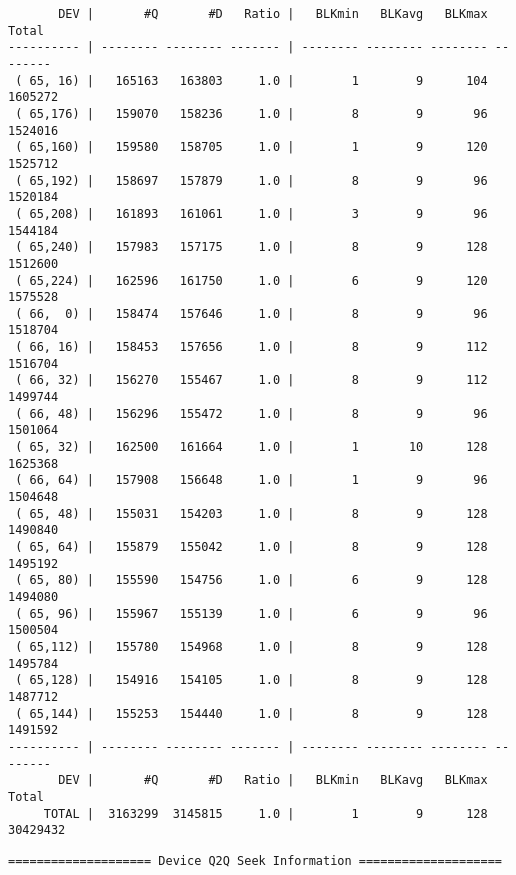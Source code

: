 \begin{verbatim}
       DEV |       #Q       #D   Ratio |   BLKmin   BLKavg   BLKmax    Total
---------- | -------- -------- ------- | -------- -------- -------- --------
 ( 65, 16) |   165163   163803     1.0 |        1        9      104  1605272
 ( 65,176) |   159070   158236     1.0 |        8        9       96  1524016
 ( 65,160) |   159580   158705     1.0 |        1        9      120  1525712
 ( 65,192) |   158697   157879     1.0 |        8        9       96  1520184
 ( 65,208) |   161893   161061     1.0 |        3        9       96  1544184
 ( 65,240) |   157983   157175     1.0 |        8        9      128  1512600
 ( 65,224) |   162596   161750     1.0 |        6        9      120  1575528
 ( 66,  0) |   158474   157646     1.0 |        8        9       96  1518704
 ( 66, 16) |   158453   157656     1.0 |        8        9      112  1516704
 ( 66, 32) |   156270   155467     1.0 |        8        9      112  1499744
 ( 66, 48) |   156296   155472     1.0 |        8        9       96  1501064
 ( 65, 32) |   162500   161664     1.0 |        1       10      128  1625368
 ( 66, 64) |   157908   156648     1.0 |        1        9       96  1504648
 ( 65, 48) |   155031   154203     1.0 |        8        9      128  1490840
 ( 65, 64) |   155879   155042     1.0 |        8        9      128  1495192
 ( 65, 80) |   155590   154756     1.0 |        6        9      128  1494080
 ( 65, 96) |   155967   155139     1.0 |        6        9       96  1500504
 ( 65,112) |   155780   154968     1.0 |        8        9      128  1495784
 ( 65,128) |   154916   154105     1.0 |        8        9      128  1487712
 ( 65,144) |   155253   154440     1.0 |        8        9      128  1491592
---------- | -------- -------- ------- | -------- -------- -------- --------
       DEV |       #Q       #D   Ratio |   BLKmin   BLKavg   BLKmax    Total
     TOTAL |  3163299  3145815     1.0 |        1        9      128 30429432
\end{verbatim}\newpage\begin{verbatim}
==================== Device Q2Q Seek Information ====================


\end{verbatim}

